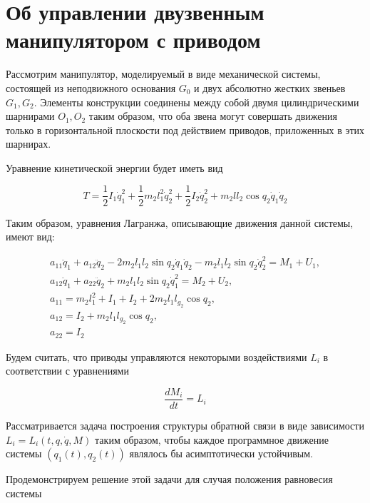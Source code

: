 \section{Об управлении двузвенным манипулятором с приводом} \label{p24}

Рассмотрим манипулятор, моделируемый в виде механической системы, состоящей из неподвижного основания $G_0$ и двух абсолютно жестких звеньев $G_1, G_2$. Элементы конструкции соединены между собой двумя цилиндрическими шарнирами $O_1, O_2$ таким образом, что оба звена могут совершать движения только в горизонтальной плоскости под действием приводов, приложенных в этих шарнирах.

Уравнение кинетической энергии будет иметь вид

\begin{equation} \label{2.12'}
T = \frac12 I_1 \dot q_1^2 + \frac12 m_2 l_1^2 \dot q_2^2 + \frac12 I_2 \dot q_2^2 + m_2 l l_2 \cos q_2 \dot q_1 \dot q_2
\end{equation}

Таким образом, уравнения Лагранжа, описывающие движения данной системы, имеют вид:

\begin{equation} \label{2.13'}
\begin{array}{l}
a_{11} \ddot q_1 + a_{12} \ddot q_2 - 2 m_2 l_1 l_2 \sin q_2 \dot q_1 \dot q_2 - m_2 l_1 l_2 \sin q_2 \dot q_2^2 = M_1 + U_1,\\
a_{12} \ddot q_1 + a_{22} \ddot q_2 + m_2 l_1 l_2 \sin q_2 \dot q_1^2 = M_2 + U_2,\\
a_{11} = m_2 l_1^2 + I_1 + I_2 + 2 m_2 l_1 l_{g_2} \cos q_2,\\
a_{12} = I_2 + m_2 l_1 l_{g_2} \cos q_2, \\
a_{22} = I_2
\end{array}
\end{equation}

Будем считать, что приводы управляются некоторыми воздействиями $L_{i}$ в соответствии с уравнениями 

\begin{equation} \label{2.14'}
\frac{d M_i}{dt} = L_{i}
\end{equation}

Рассматривается задача построения структуры обратной связи в виде зависимости $L_{i} = L_{i} (t, q, \dot q, M)$ таким образом, чтобы каждое программное движение системы $(q_1 (t), q_2 (t))$ являлось бы асимптотически устойчивым. 

Продемонстрируем решение этой задачи для случая положения равновесия системы

